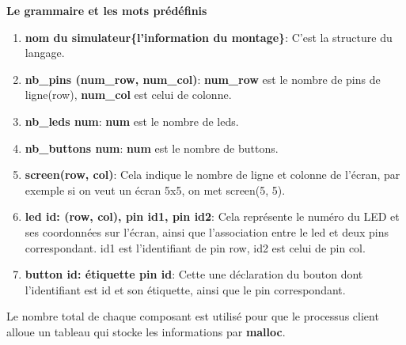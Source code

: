 \documentclass[14px]{article}
\begin{document}
	\begin{figure}[htbp]
	\end{figure}

	\textbf{Le grammaire et les mots prédéfinis}
	\begin{enumerate}
		\item \textbf{nom du simulateur\{l'information du montage\}}: C'est la structure du langage.
		\item \textbf{nb\_pins (num\_row, num\_col)}: \textbf{num\_row} est le nombre de pins de ligne(row), \textbf{num\_col} est celui de colonne.
		\item \textbf{nb\_leds num}: \textbf{num} est le nombre de leds.
		\item \textbf{nb\_buttons num}: \textbf{num} est le nombre de buttons.
		\item \textbf{screen(row, col)}: Cela indique le nombre de ligne et colonne de l'écran, par exemple si on veut un écran 5x5, on met screen(5, 5).
		\item \textbf{led id: (row, col), pin id1, pin id2}: Cela représente le numéro du LED et ses coordonnées sur l'écran, ainsi que l'association entre le led et deux pins correspondant. id1 est l'identifiant de pin row, id2 est celui de pin col.
		\item \textbf{button id: étiquette pin id}: Cette une déclaration du bouton dont l'identifiant est id et son étiquette, ainsi que le pin correspondant.
	\end{enumerate}
	Le nombre total de chaque composant est utilisé pour que le processus client alloue un tableau qui stocke les informations par \textbf{malloc}.


	\clearpage
	\pagestyle{fancy}
	\rhead{\thepage}
	\fancyfoot{}

	\clearpage
\end{document}
